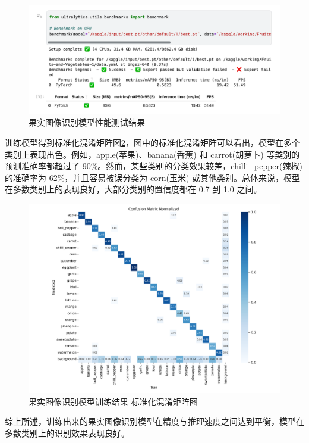 \begin{figure}
    \centering
    \includegraphics[width=0.95\linewidth]{../source/aws-img/yolov8/benchmark.png}
    \caption{果实图像识别模型性能测试结果}
    \label{fig:model-benchmark}
\end{figure}

训练模型得到标准化混淆矩阵图\ref{fig:confusion_matrix_normalized}，图中的标准化混淆矩阵可以看出，模型在多个类别上表现出色。例如，apple(苹果)、banana(香蕉) 和 carrot(胡萝卜) 等类别的预测准确率都超过了 90\%。然而，某些类别的分类效果较差，chilli\_pepper(辣椒)的准确率为 62\%，并且容易被误分类为 corn(玉米) 或其他类别。总体来说，模型在多数类别上的表现良好，大部分类别的置信度都在 0.7 到 1.0 之间。

\begin{figure}
    \centering
    \includegraphics[width=0.95\linewidth]{../source/aws-img/yolov8/out/image/confusion_matrix_normalized.png}
    \caption{果实图像识别模型训练结果-标准化混淆矩阵图}
    \label{fig:confusion_matrix_normalized}
\end{figure}

综上所述，训练出来的果实图像识别模型在精度与推理速度之间达到平衡，模型在多数类别上的识别效果表现良好。

